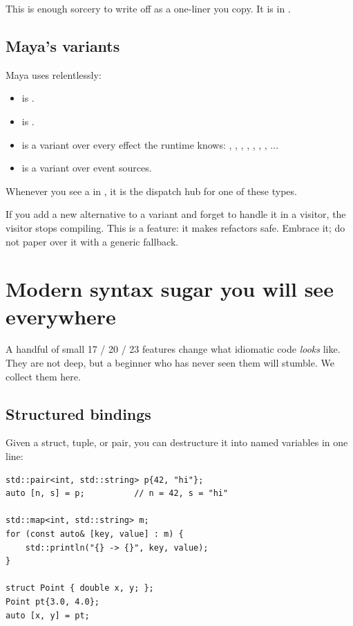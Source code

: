 This is enough \cpp{} sorcery to write off as a one-liner you copy.
It is in .

\subsection{Maya's variants}

Maya uses  relentlessly:

\begin{itemize}[leftmargin=*]
  \item {} is
    .
  \item {} is
    .
  \item {} is a variant over every effect the runtime
    knows: , , , ,
    , , , ...
  \item {} is a variant over event sources.
\end{itemize}

Whenever you see a  in \maya{}, it is the dispatch
hub for one of these types.

\begin{warning}
If you add a new alternative to a variant and forget to handle it in
a visitor, the visitor stops compiling. This is a feature: it makes
refactors safe. Embrace it; do not paper over it with a generic
fallback.
\end{warning}

\section{Modern syntax sugar you will see everywhere}
\label{sec:cpp:sugar}

A handful of small \cpp{}17 / 20 / 23 features change what idiomatic
code \emph{looks} like. They are not deep, but a beginner who has
never seen them will stumble. We collect them here.

\subsection{Structured bindings}

Given a struct, tuple, or pair, you can destructure it into named
variables in one line:

\begin{lstlisting}
std::pair<int, std::string> p{42, "hi"};
auto [n, s] = p;          // n = 42, s = "hi"

std::map<int, std::string> m;
for (const auto& [key, value] : m) {
    std::println("{} -> {}", key, value);
}

struct Point { double x, y; };
Point pt{3.0, 4.0};
auto [x, y] = pt;
\end{lstlisting}


